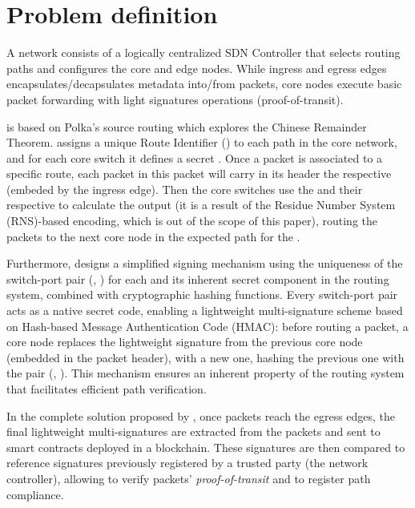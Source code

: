 \section{Problem definition} \label{sec:definition} 



A \pathsec network consists of a logically centralized SDN Controller that selects routing paths and configures the core and edge nodes. While ingress and egress edges encapsulates/decapsulates metadata into/from packets, core nodes execute basic packet forwarding with light signatures operations (proof-of-transit).

\pathsec is based on Polka's source routing which explores the Chinese Remainder Theorem\cite{polka}.
\polka assigns a unique Route Identifier (\routeid) to each path in the core network, and for each core switch it defines a secret \nodeid. Once a packet is associated to a specific route, each packet in this packet will carry in its header the respective \routeid (embeded by the ingress edge). Then the core switches use the \routeid and their respective \nodeids to calculate the output \portid (it is a result of the Residue Number System (RNS)-based encoding\cite{pathsec}, which is out of the scope of this paper), routing the packets to the next core node in the expected path for the \routeid.

Furthermore, \pathsec designs a simplified signing mechanism using the uniqueness of the switch-port pair (\nodeid, \portid) for each \routeid and its inherent secret component in the routing system, combined with cryptographic hashing functions. Every switch-port pair acts as a native secret code, enabling a lightweight multi-signature scheme based on Hash-based Message Authentication Code (HMAC): before routing a packet, a core node replaces the lightweight signature from the previous core node (embedded in the packet header), with a new one, hashing the previous one with the pair (\nodeid, \portid). This mechanism ensures an inherent property of the routing system that facilitates efficient path verification. 

In the complete solution proposed by \pathsec, once packets reach the egress edges, the final lightweight multi-signatures are extracted from the packets and sent to smart contracts deployed in a blockchain. These signatures are then compared to reference signatures previously registered by a trusted party (the network controller), allowing to verify packets' \textit{proof-of-transit} and to register path compliance.


